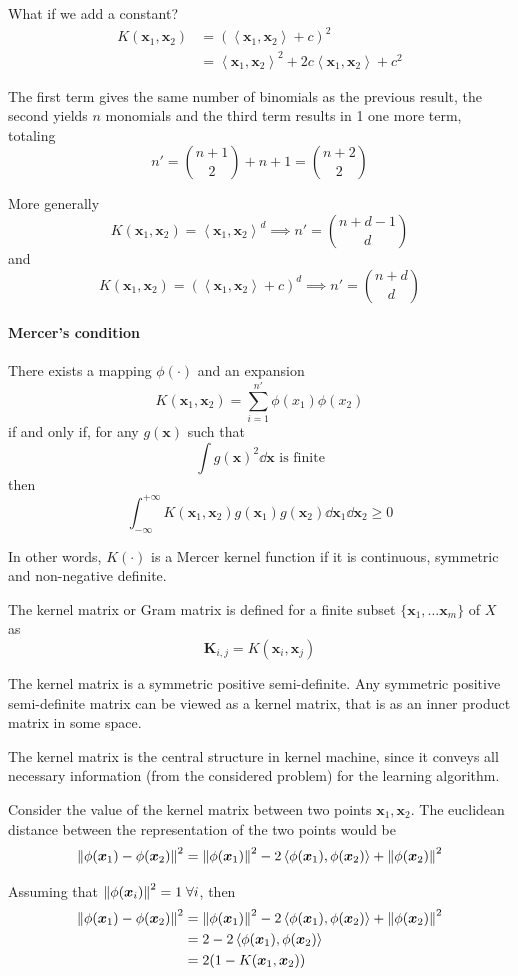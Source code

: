 \documentclass[oneside,onecolumn]{report}
\newcommand{\inp}[2]{\left\langle #1, #2 \right\rangle}
\begin{document}
What if we add a constant?
\begin{align*}
    K(\bm x_1, \bm x_2)
    &= (\inp{\bm x_1}{\bm x_2} + c)^2 \\
    &= \inp{\bm x_1}{\bm x_2}^2 + 2 c \inp{\bm x_1}{\bm x_2} + c^2
\end{align*}

The first term gives the same number of binomials as the previous result, the second yields $n$ monomials and the third term results in 1 one more term, totaling
$$ n' = \binom{n + 1}{2} + n + 1 = \binom{n + 2}{2} $$

More generally
$$ K(\bm x_1, \bm x_2) = \inp{\bm x_1}{\bm x_2}^d \implies n' = \binom{n + d - 1}{d} $$
and
$$ K(\bm x_1, \bm x_2) = (\inp{\bm x_1}{\bm x_2} + c)^d \implies n' = \binom{n + d}{d} $$

\paragraph{Mercer's condition}
There exists a mapping $\phi(\cdot)$ and an expansion
$$ K(\bm x_1, \bm x_2) = \sum_{i = 1}^{n'} \phi(x_1) \phi(x_2) $$
if and only if, for any $g(\bm x)$ such that
$$ \int g(\bm x)^2 \dd \bm x \text{ is finite} $$
then
$$ \int_{-\infty}^{+\infty} K(\bm x_1, \bm x_2) g(\bm x_1) g(\bm x_2) \dd \bm x_1 \dd \bm x_2 \geq 0 $$

In other words, $K(\cdot)$ is a Mercer kernel function if it is continuous, symmetric and non-negative definite.

The kernel matrix or Gram matrix is defined for a finite subset $\{\bm x_1, \dots \bm x_m\}$ of $X$ as
$$ \bm K_{i, j} = K(\bm x_i, \bm x_j) $$

The kernel matrix is a symmetric positive semi-definite.
Any symmetric positive semi-definite matrix can be viewed as a kernel matrix, that is as an inner product matrix in some space.

The kernel matrix is the central structure in kernel machine, since it conveys all necessary information (from the considered problem) for the learning algorithm.

Consider the value of the kernel matrix between two points $\bm x_1, \bm x_2$.
The euclidean distance between the representation of the two points would be
$$ \norm{\phi(\bm x_1) - \phi(\bm x_2)}^2
= \norm{\phi(\bm x_1)}^2 - 2 \inp{\phi(\bm x_1)}{\phi(\bm x_2)} + \norm{\phi(\bm x_2)}^2 $$

Assuming that $\norm{\phi(\bm x_i)}^2 = 1 \; \forall i$, then
\begin{align*}
    \norm{\phi(\bm x_1) - \phi(\bm x_2)}^2
    &= \norm{\phi(\bm x_1)}^2 - 2 \inp{\phi(\bm x_1)}{\phi(\bm x_2)} + \norm{\phi(\bm x_2)}^2 \\
    &= 2 - 2 \inp{\phi(\bm x_1)}{\phi(\bm x_2)} \\
    &= 2 (1 - K(\bm x_1, \bm x_2))
\end{align*}
\end{document}
